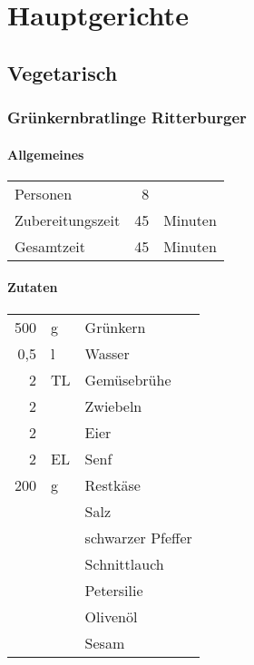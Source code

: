 \chapter{Hauptgerichte}
\section{Vegetarisch}
\subsection{Grünkernbratlinge Ritterburger} 
\subsubsection*{Allgemeines}
\begin{tabular}{lrl}
    Personen         &                        8 &  \\
    Zubereitungszeit &                       45 & Minuten \\
    Gesamtzeit       &                       45 & Minuten \\
\end{tabular} 

\subsubsection*{Zutaten}
\begin{tabular}{rll}
    500 & g  & Grünkern          \\
    0,5 & l  & Wasser            \\
    2 & TL & Gemüsebrühe       \\
    2 &    & Zwiebeln          \\
    2 &    & Eier              \\
    2  & EL & Senf              \\
    200 & g  & Restkäse          \\
    &    & Salz              \\
    &    & schwarzer Pfeffer \\
    &    & Schnittlauch      \\
    &    & Petersilie        \\
    &    & Olivenöl          \\
    &    & Sesam
\end{tabular} 
